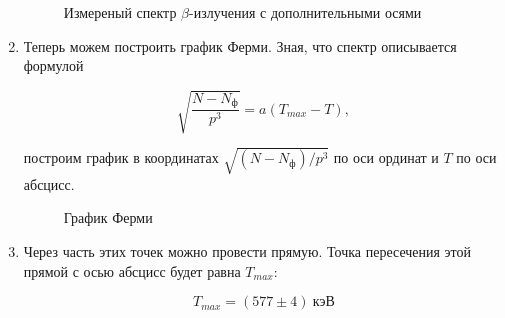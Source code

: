 \documentclass[14pt, a4paper]{report}
\begin{document}
\begin{enumerate}
\begin{figure}[H]
\centering
{}
\caption{Измереный спектр $\beta$-излучения с дополнительными осями}
\end{figure}

\item Теперь можем построить график Ферми. Зная, что спектр описывается формулой

\[\sqrt{\frac{N-N_{ф}}{p^3}}=a(T_{max}-T),\]

построим график в координатах $\sqrt{(N-N_{ф})/p^3}$ по оси ординат и $T$ по оси абсцисс.

\begin{figure}[H]
\centering
{}
\caption{График Ферми}
\end{figure}

\item Через часть этих точек можно провести прямую. Точка пересечения этой прямой с осью абсцисс будет равна $T_{max}$:

\[T_{max}=(577\pm4)\ кэВ\]

\end{enumerate}
\end{document}
